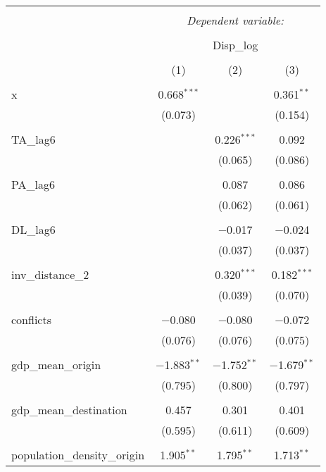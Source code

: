 
\begin{table}[!htbp] \centering 
  \caption{} 
  \label{} 
\begin{tabular}{@{\extracolsep{5pt}}lccc} 
\\[-1.8ex]\hline 
\hline \\[-1.8ex] 
 & \multicolumn{3}{c}{\textit{Dependent variable:}} \\ 
\cline{2-4} 
\\[-1.8ex] & \multicolumn{3}{c}{Disp\_log} \\ 
\\[-1.8ex] & (1) & (2) & (3)\\ 
\hline \\[-1.8ex] 
 x & 0.668$^{***}$ &  & 0.361$^{**}$ \\ 
  & (0.073) &  & (0.154) \\ 
  & & & \\ 
 TA\_lag6 &  & 0.226$^{***}$ & 0.092 \\ 
  &  & (0.065) & (0.086) \\ 
  & & & \\ 
 PA\_lag6 &  & 0.087 & 0.086 \\ 
  &  & (0.062) & (0.061) \\ 
  & & & \\ 
 DL\_lag6 &  & $-$0.017 & $-$0.024 \\ 
  &  & (0.037) & (0.037) \\ 
  & & & \\ 
 inv\_distance\_2 &  & 0.320$^{***}$ & 0.182$^{***}$ \\ 
  &  & (0.039) & (0.070) \\ 
  & & & \\ 
 conflicts & $-$0.080 & $-$0.080 & $-$0.072 \\ 
  & (0.076) & (0.076) & (0.075) \\ 
  & & & \\ 
 gdp\_mean\_origin & $-$1.883$^{**}$ & $-$1.752$^{**}$ & $-$1.679$^{**}$ \\ 
  & (0.795) & (0.800) & (0.797) \\ 
  & & & \\ 
 gdp\_mean\_destination & 0.457 & 0.301 & 0.401 \\ 
  & (0.595) & (0.611) & (0.609) \\ 
  & & & \\ 
 population\_density\_origin & 1.905$^{**}$ & 1.795$^{**}$ & 1.713$^{**}$ \\ 

\end{tabular}
\end{table}
